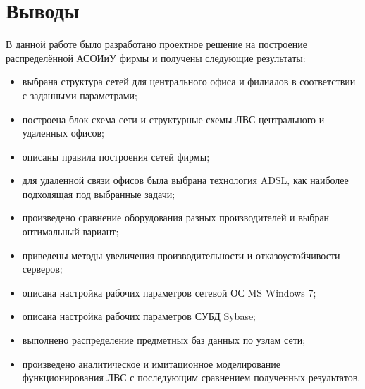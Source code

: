 \newpage

\section{Выводы}

В данной работе было разработано проектное решение на построение распределённой АСОИиУ фирмы и получены следующие результаты:
\begin{itemize}
\item выбрана структура сетей для центрального офиса и филиалов в соответствии с заданными параметрами;
\item построена блок-схема сети и структурные схемы ЛВС центрального и удаленных офисов;
\item описаны правила построения сетей фирмы;
\item для удаленной связи офисов была выбрана технология ADSL, как наиболее подходящая под выбранные задачи;
\item произведено сравнение оборудования разных производителей и выбран оптимальный вариант;
\item приведены методы увеличения производительности и отказоустойчивости серверов;
\item описана настройка рабочих параметров сетевой ОС MS Windows 7;
\item описана настройка рабочих параметров СУБД Sybase;
\item выполнено распределение предметных баз данных по узлам сети;
\item произведено аналитическое и имитационное моделирование функционирования ЛВС с последующим сравнением полученных результатов.
\end{itemize}
